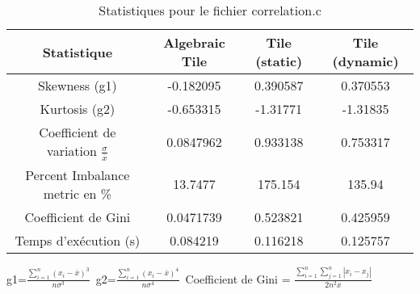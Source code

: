 \documentclass{article}
\begin{document}
\begin{table}[htbp]
  \centering
  \caption{Statistiques pour le fichier correlation.c}
  \begin{tabular}{|c|c|c|c|}
    \hline
    Statistique & Algebraic Tile & Tile (static) & Tile (dynamic) \\ 
    \hline
    Skewness (g1)  & -0.182095 & 0.390587 & 0.370553 \\ 
    Kurtosis (g2)  & -0.653315 & -1.31771 & -1.31835 \\ 
    Coefficient de variation $ \frac{\sigma}{\overline{x}} $ & 0.0847962 & 0.933138 & 0.753317\\ 
    Percent Imbalance metric en \% & 13.7477 & 175.154 & 135.94\\ 
    Coefficient de Gini  & 0.0471739 & 0.523821 & 0.425959\\ 
    Temps d'exécution (s) &  0.084219    &  0.116218   &  0.125757   \\ 

    \hline
  \end{tabular}
\end{table}
g1=$ \frac{\sum_{i=1}^{n} (x_i - \overline{x})^3}{n\sigma^3} $\
g2=$ \frac{\sum_{i=1}^{n} (x_i - \overline{x})^4}{n\sigma^4} $\
Coefficient de Gini = $ \frac{\sum_{i=1}^{n}\sum_{j=1}^{n} |x_i - x_j|}{2n^2\overline{x}} $\
\newpage
\end{document}
